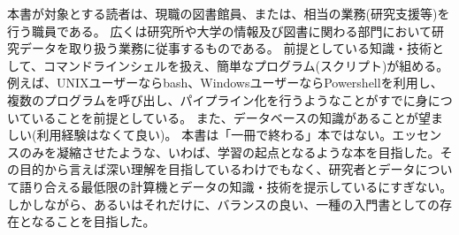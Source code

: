 本書が対象とする読者は、現職の図書館員、または、相当の業務(研究支援等)を行う職員である。
広くは研究所や大学の情報及び図書に関わる部門において研究データを取り扱う業務に従事するものである。
前提としている知識・技術として、コマンドラインシェルを扱え、簡単なプログラム(スクリプト)が組める。
例えば、UNIXユーザーならbash、WindowsユーザーならPowershellを利用し、複数のプログラムを呼び出し、パイプライン化を行うようなことがすでに身についていることを前提としている。
また、データベースの知識があることが望ましい(利用経験はなくて良い)。
本書は「一冊で終わる」本ではない。エッセンスのみを凝縮させたような、いわば、学習の起点となるような本を目指した。その目的から言えば深い理解を目指しているわけでもなく、研究者とデータについて語り合える最低限の計算機とデータの知識・技術を提示しているにすぎない。しかしながら、あるいはそれだけに、バランスの良い、一種の入門書としての存在となることを目指した。
